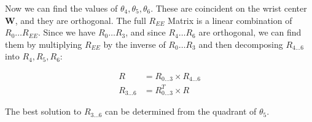 \documentclass{article}
\begin{document}
Now we can find the values of $\theta_4, \theta_5, \theta_6$.
These are coincident on the wrist center $\mathbf{W}$,
and they are orthogonal. The full $R_{EE}$
Matrix is a linear combination of $R_{0} \dots R_{EE}$.
Since we have $R_{0} \dots R_{3}$,
and since $R_{4} \dots R_{6}$
are orthogonal, we can find them by multiplying $R_{EE}$
by the inverse of $R_{0} \dots R_{3}$ and then decomposing
$R_{4\dots6}$ into $R_4, R_5, R_6$:

\begin{align}
  R &= R_{0\dots3} \times R_{4\dots6} \\
  R_ {3\dots6} &= R_{0\dots3}^T \times R
\end{align}

The best solution to $R_{3\dots6}$ can be determined from the quadrant
of $\theta_5$.
\end{document}
